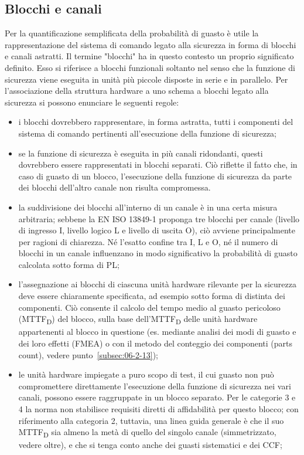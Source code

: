 \subsection{Blocchi e canali}
\label{subsec:06-2-8}
Per la quantificazione semplificata della probabilità di guasto è utile la rappresentazione del sistema di comando legato alla sicurezza in forma di blocchi e canali astratti. Il termine "blocchi" ha in questo contesto un proprio significato definito. Esso si riferisce a blocchi funzionali soltanto nel senso che la funzione di sicurezza viene eseguita in unità più piccole disposte in serie e in parallelo. Per l'associazione della struttura hardware a uno schema a blocchi legato alla sicurezza si possono enunciare le seguenti regole:
\begin{itemize}
    \item i blocchi dovrebbero rappresentare, in forma astratta, tutti i componenti del sistema di comando pertinenti all'esecuzione della funzione di sicurezza;
    \item se la funzione di sicurezza è eseguita in più canali ridondanti, questi dovrebbero essere rappresentati in blocchi separati. Ciò riflette il fatto che, in caso di guasto di un blocco, l'esecuzione della funzione di sicurezza da parte dei blocchi dell'altro canale non risulta compromessa.
    \item la suddivisione dei blocchi all'interno di un canale è in una certa misura arbitraria; sebbene la EN ISO 13849-1 proponga tre blocchi per canale (livello di ingresso I, livello logico L e livello di uscita O), ciò avviene principalmente per ragioni di chiarezza. Né l'esatto confine tra I, L e O, né il numero di blocchi in un canale influenzano in modo significativo la probabilità di guasto calcolata sotto forma di PL;
    \item l'assegnazione ai blocchi di ciascuna unità hardware rilevante per la sicurezza deve essere chiaramente specificata, ad esempio sotto forma di distinta dei componenti. Ciò consente il calcolo del tempo medio al guasto pericoloso (MTTF\textsubscript{D}) del blocco, sulla base dell'MTTF\textsubscript{D} delle unità hardware appartenenti al blocco in questione (es. mediante analisi dei modi di guasto e dei loro effetti (FMEA) o con il metodo del conteggio dei componenti (parts count), vedere punto~\ref{subsec:06-2-13});
    \item le unità hardware impiegate a puro scopo di test, il cui guasto non può compromettere direttamente l'esecuzione della funzione di sicurezza nei vari canali, possono essere raggruppate in un blocco separato. Per le categorie 3 e 4 la norma non stabilisce requisiti diretti di affidabilità per questo blocco; con riferimento alla categoria 2, tuttavia, una linea guida generale è che il suo MTTF\textsubscript{D} sia almeno la metà di quello del singolo canale (simmetrizzato, vedere oltre), e che si tenga conto anche dei guasti sistematici e dei CCF;
\end{itemize}

